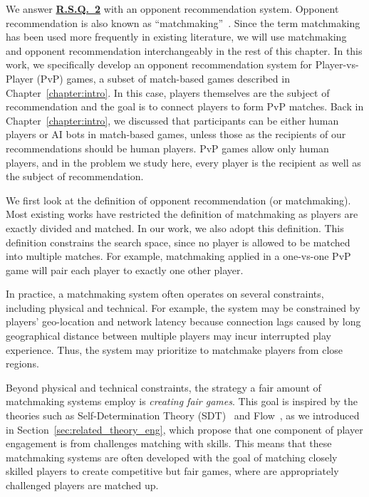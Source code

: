 We answer \hyperref[rq2]{\textbf{R.S.Q.~2}} with an opponent recommendation system. Opponent recommendation is also known as ``matchmaking''~\citep{medler2011using}. Since the term matchmaking has been used more frequently in existing literature, we will use matchmaking and opponent recommendation interchangeably in the rest of this chapter. In this work, we specifically develop an opponent recommendation system for Player-vs-Player (PvP) games, a subset of match-based games described in Chapter~\ref{chapter:intro}. In this case, players themselves are the subject of recommendation and the goal is to connect players to form  PvP matches. Back in Chapter~\ref{chapter:intro}, we discussed that participants can be either human players or AI bots in match-based games, unless those as the recipients of our recommendations should be human players. PvP games allow only human players, and in the  problem we study here, every player is the recipient as well as the subject of recommendation. 

We first look at the definition of opponent recommendation (or matchmaking). Most existing works have restricted the definition of matchmaking as players are exactly divided and matched. In our work, we also adopt this definition. This definition constrains the search space, since no player is allowed to be matched into multiple matches. For example, matchmaking applied in a one-vs-one PvP game will pair each player to exactly one other player. 


In practice, a matchmaking system often operates on several constraints, including physical and technical. For example, the system may be constrained by players' geo-location and network latency because connection lags caused by long geographical distance between multiple players may incur interrupted play experience. Thus, the system may prioritize to matchmake players from close regions.

Beyond physical and technical constraints, the strategy a fair amount of matchmaking systems employ is \emph{creating fair games}. This goal is inspired by the theories such as Self-Determination Theory (SDT)~\citep{ryan2000self} and Flow~\citep{flow1990psychology}, as we introduced in Section~\ref{sec:related_theory_eng}, which propose that one component of player engagement is from challenges matching with skills. This means that these matchmaking systems are often developed with the goal of matching closely skilled players to create competitive but fair games, where are appropriately challenged players are matched up. 

